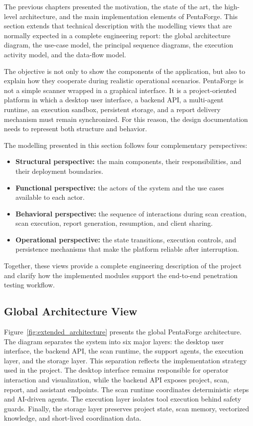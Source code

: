 \documentclass[12pt,a4paper]{report}
\begin{document}
The previous chapters presented the motivation, the state of the art, the high-level
architecture, and the main implementation elements of PentaForge. This section extends
that technical description with the modelling views that are normally expected in a
complete engineering report: the global architecture diagram, the use-case model, the
principal sequence diagrams, the execution activity model, and the data-flow model.

The objective is not only to show the components of the application, but also to explain
how they cooperate during realistic operational scenarios. PentaForge is not a simple
scanner wrapped in a graphical interface. It is a project-oriented platform in which a
desktop user interface, a backend API, a multi-agent runtime, an execution sandbox,
persistent storage, and a report delivery mechanism must remain synchronized. For this
reason, the design documentation needs to represent both structure and behavior.

The modelling presented in this section follows four complementary perspectives:

\begin{itemize}
    \item \textbf{Structural perspective:} the main components, their responsibilities,
    and their deployment boundaries.
    \item \textbf{Functional perspective:} the actors of the system and the use cases
    available to each actor.
    \item \textbf{Behavioral perspective:} the sequence of interactions during scan
    creation, scan execution, report generation, resumption, and client sharing.
    \item \textbf{Operational perspective:} the state transitions, execution controls,
    and persistence mechanisms that make the platform reliable after interruption.
\end{itemize}

Together, these views provide a complete engineering description of the project and
clarify how the implemented modules support the end-to-end penetration testing workflow.

\subsection{Global Architecture View}

Figure~\ref{fig:extended_architecture} presents the global PentaForge architecture. The
diagram separates the system into six major layers: the desktop user interface, the
backend API, the scan runtime, the support agents, the execution layer, and the storage
layer. This separation reflects the implementation strategy used in the project. The
desktop interface remains responsible for operator interaction and visualization, while
the backend API exposes project, scan, report, and assistant endpoints. The scan runtime
coordinates deterministic steps and AI-driven agents. The execution layer isolates tool
execution behind safety guards. Finally, the storage layer preserves project state,
scan memory, vectorized knowledge, and short-lived coordination data.
\end{document}
